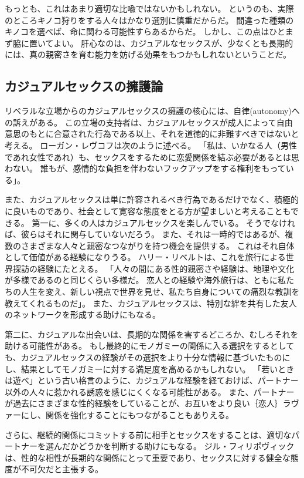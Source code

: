 \documentclass[paper=a4,book,openany]{jlreq}
\begin{document}
もっとも、これはあまり適切な比喩ではないかもしれない。
というのも、実際のところキノコ狩りをする人々はかなり選別に慎重だからだ。
間違った種類のキノコを選べば、命に関わる可能性すらあるからだ。
しかし、この点はひとまず脇に置いてよい。
肝心なのは、カジュアルなセックスが、少なくとも長期的には、真の親密さを育む能力を妨げる効果をもつかもしれないということだ。

\subsection{カジュアルセックスの擁護論}

リベラルな立場からのカジュアルセックスの擁護の核心には、自律(autonomy)への訴えがある。
この立場の支持者は、カジュアルセックスが成人によって自由意思のもとに合意された行為である以上、それを道徳的に非難すべきではないと考える。
ローガン・レヴコフは次のように述べる。
「私は、いかなる人（男性であれ女性であれ）も、セックスをするために恋愛関係を結ぶ必要があるとは思わない。
誰もが、感情的な負担を伴わないフックアップをする権利をもっている」\citep{levkoff13:_penn_grad_resp}。

また、カジュアルセックスは単に許容されるべき行為であるだけでなく、積極的に良いものであり、社会として寛容な態度をとる方が望ましいと考えることもできる。
第一に、多くの人はカジュアルセックスを楽しんでいる。
そうでなければ、彼らはそれに関与していないだろう。
また、それは一時的ではあるが、複数のさまざまな人々と親密なつながりを持つ機会を提供する。
これはそれ自体として価値がある経験になりうる。
ハリー・リベルトは、これを旅行による世界探訪の経験にたとえる。
「人々の間にある性的親密さや経験は、地理や文化が多様であるのと同じくらい多様だ。
恋人との経験や海外旅行は、ともに私たちの人生を変え、新しい視点で世界を見せ、私たち自身についての痛烈な教訓を教えてくれるものだ」\citep[p.414]{liberto17:_prob_sexual_prom}。
また、カジュアルセックスは、特別な絆を共有した友人のネットワークを形成する助けにもなる。

第二に、カジュアルな出会いは、長期的な関係を害するどころか、むしろそれを助ける可能性がある。
もし最終的にモノガミーの関係に入る選択をするとしても、カジュアルセックスの経験がその選択をより十分な情報に基づいたものにし、結果としてモノガミーに対する満足度を高めるかもしれない。
「若いときは遊べ」という古い格言のように、カジュアルな経験を経ておけば、パートナー以外の人々に惹かれる誘惑を感じにくくなる可能性がある。
また、パートナーが過去にさまざまな性的経験をしていることが、お互いをより良い｛恋人｝{ラヴァー}にし、関係を強化することにもつながることもありえる。

さらに、継続的関係にコミットする前に相手とセックスをすることは、適切なパートナーを選んだかどうかを判断する助けにもなる。
ジル・フィリポヴィックは、性的な相性が長期的な関係にとって重要であり、セックスに対する健全な態度が不可欠だと主張する。
\end{document}

